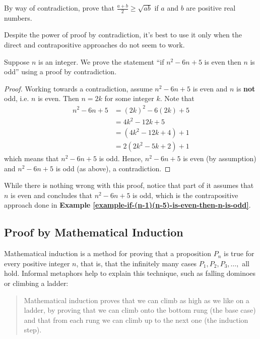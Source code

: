 \begin{exercise}
    By way of contradiction, prove that $\frac{a+b}{2} \geq \sqrt{ab}$ if $a$ and $b$ are positive real numbers.
\end{exercise}

Despite the power of proof by contradiction, it's best to use it only when the direct and contrapositive approaches do not seem to work.
\begin{example}
    Suppose $n$ is an integer. We prove the statement ``if $n^2 - 6n + 5$ is even then $n$ is odd'' using a proof by contradiction.
    \begin{proof}
        Working towards a contradiction, assume $n^2 - 6n + 5$ is even and $n$ is \textbf{not} odd, i.e. $n$ is even. Then $n = 2k$ for some integer $k$. Note that
        \begin{align*}
            n^2 - 6n + 5 &= (2k)^2 - 6(2k) + 5\\
            &= 4k^2 - 12k + 5\\
            &= (4k^2 - 12k + 4) + 1\\
            &= 2(2k^2 - 5k + 2) + 1
        \end{align*}
        which means that $n^2 - 6n + 5$ is odd. Hence, $n^2 - 6n + 5$ is even (by assumption) and $n^2 - 6n + 5$ is odd (as above), a contradiction.
    \end{proof}
    While there is nothing wrong with this proof, notice that part of it assumes that $n$ is even and concludes that  $n^2 - 6n + 5$ is odd, which is the contrapositive approach done in \textbf{Example \ref{example-if-(n-1)(n-5)-is-even-then-n-is-odd}}.
\end{example}

\subsection{Proof by Mathematical Induction}
Mathematical induction is a method for proving that a proposition $P_n$ is true for every positive integer $n$, that is, that the infinitely many cases $P_1, P_2, P_3, \dots,$ all hold. Informal metaphors help to explain this technique, such as falling dominoes or climbing a ladder:
\begin{quote}
    Mathematical induction proves that we can climb as high as we like on a ladder, by proving that we can climb onto the bottom rung (the base case) and that from each rung we can climb up to the next one (the induction step).
\end{quote}

